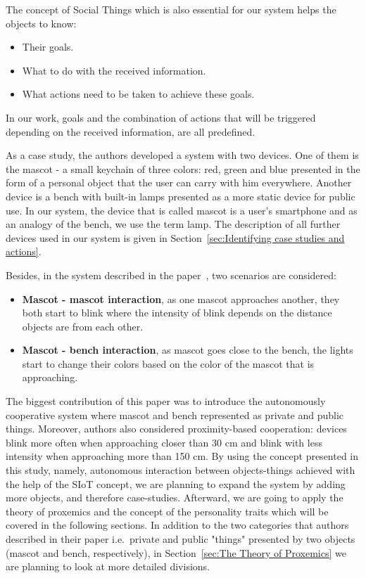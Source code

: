 The concept of Social Things which is also essential for our system helps the objects to know:
\begin{itemize}
    \item Their goals.
    \item What to do with the received information.
    \item What actions need to be taken to achieve these goals.
\end{itemize}
In our work, goals and the combination of actions that will be triggered
depending on the received information, are all predefined.

As a case study, the authors developed a system with two devices.
One of them is the mascot - a small keychain of three colors:
red, green and blue presented in the form of a personal object that the user can carry with him everywhere.
Another device is a bench with built-in lamps presented as a more static device for public use.
In our system, the device that is called mascot is a user's smartphone and as an
analogy of the bench, we use the term lamp.
The description of all further devices used in our system is given
in Section~\ref{sec:Identifying case studies and actions}.

Besides, in the system described in the paper~\cite{okada2016autonomous}, two scenarios are considered:
\begin{itemize}
  \item \textbf{Mascot - mascot interaction}, as one mascot approaches another, they both start to blink where the
        intensity of blink depends on the distance objects are from each other.
  \item \textbf{Mascot - bench interaction}, as mascot goes close to the bench, the lights
        start to change their colors based on the color of the mascot that is approaching.
\end{itemize}

The biggest contribution of this paper was to introduce the autonomously cooperative
system where mascot and bench represented as private and public things.
Moreover, authors also considered proximity-based cooperation: devices blink more often when
approaching closer than 30 cm and blink with less intensity when approaching more than 150 cm.
By using the concept presented in this study, namely, autonomous interaction between objects-things
achieved with the help of the SIoT concept, we are planning to expand the system by adding more objects,
and therefore case-studies.
Afterward, we are going to apply the theory of proxemics and the concept of the personality
traits which will be covered in the following sections.
In addition to the two categories that authors described in their paper i.e.\ private and public "things"
presented by two objects (mascot and bench, respectively), in Section~\ref{sec:The Theory of Proxemics}
we are planning to look at more detailed divisions.

